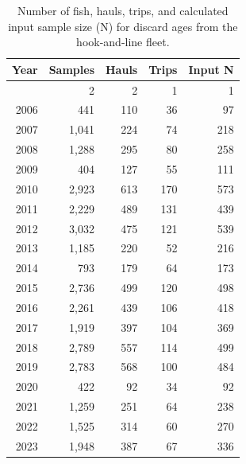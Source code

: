 \documentclass[
  english,
]{article}
\begin{document}
\begin{longtable}{rrrrr}

\caption{\label{tbl-discard-hkl-age-samples}Number of fish, hauls,
trips, and calculated input sample size (N) for discard ages from the
hook-and-line fleet.}

\tabularnewline

\toprule
Year & Samples & Hauls & Trips & Input N \\ 
\midrule\addlinespace[2.5pt]
2005 & 2 & 2 & 1 & 1 \\ 
2006 & 441 & 110 & 36 & 97 \\ 
2007 & 1,041 & 224 & 74 & 218 \\ 
2008 & 1,288 & 295 & 80 & 258 \\ 
2009 & 404 & 127 & 55 & 111 \\ 
2010 & 2,923 & 613 & 170 & 573 \\ 
2011 & 2,229 & 489 & 131 & 439 \\ 
2012 & 3,032 & 475 & 121 & 539 \\ 
2013 & 1,185 & 220 & 52 & 216 \\ 
2014 & 793 & 179 & 64 & 173 \\ 
2015 & 2,736 & 499 & 120 & 498 \\ 
2016 & 2,261 & 439 & 106 & 418 \\ 
2017 & 1,919 & 397 & 104 & 369 \\ 
2018 & 2,789 & 557 & 114 & 499 \\ 
2019 & 2,783 & 568 & 100 & 484 \\ 
2020 & 422 & 92 & 34 & 92 \\ 
2021 & 1,259 & 251 & 64 & 238 \\ 
2022 & 1,525 & 314 & 60 & 270 \\ 
2023 & 1,948 & 387 & 67 & 336 \\ 
\bottomrule

\end{longtable}

\endgroup

\pagebreak

\begingroup
\fontsize{9.0pt}{11.0pt}\selectfont
\end{document}
